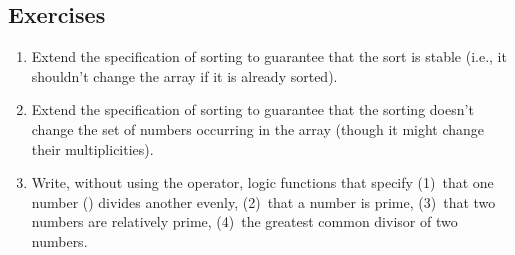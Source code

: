 







\subsection*{Exercises}
\begin{enumerate}
\item
Extend the specification of sorting to guarantee that the sort
is stable (i.e., it shouldn't change the array if it is already
sorted).  
\item
Extend the specification of sorting to guarantee that the sorting
doesn't change the set of numbers occurring in the array (though it
might change their multiplicities). 
\item
Write, without using the \vcc{\%} operator, logic functions that
specify (1)~that one number () divides another
evenly, (2)~that a number is prime, (3)~that two numbers are
relatively prime, (4)~the greatest common divisor of two numbers.
\end{enumerate}
